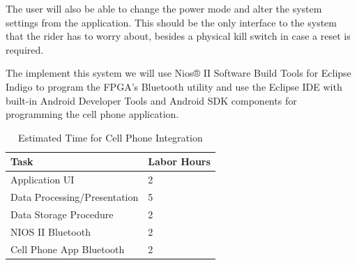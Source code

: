 \documentclass[12pt,article]{IEEEtran}
\begin{document}
            The user will also be able to change the power mode and alter the system settings from the
            application. This should be the only interface to the system that the rider has to worry about,
            besides a physical kill switch in case a reset is required.
            
            The implement this system we will use Nios® II Software Build Tools for Eclipse Indigo to program 
            the FPGA’s Bluetooth utility and use the Eclipse IDE with built-in Android Developer Tools and Android 
            SDK components for programming the cell phone application.
    
        \begin{table}[H]        
            \renewcommand{\arraystretch}{1.3}
                \caption{Estimated Time for Cell Phone Integration}
                
                \label{Estimated Time}
                
                \centering
                \begin{tabular}{p{5.5cm}|p{2cm}}
                \hline
                \bfseries   Task                            & \bfseries Labor Hours                     \\
                \hline\hline
                            Application UI                  & 2                                         \\
                            Data Processing/Presentation    & 5                                         \\
                            Data Storage Procedure          & 2                                         \\  
                            NIOS II Bluetooth               & 2                                         \\  
                            Cell Phone App Bluetooth        & 2                                         \\
                            \hline                          
                \end{tabular}
        \end{table}

\end{document}
